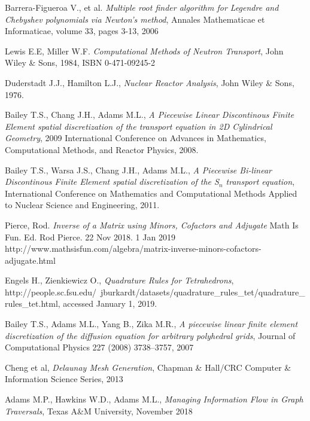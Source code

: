 \documentclass[11pt,letterpaper,titlepage]{article}
\numberwithin{equation}{section}
\begin{document}
\newpage
{}
\begin{thebibliography}{1}
    
     Barrera-Figueroa V., et al. {\em Multiple root finder algorithm for Legendre and Chebyshev polynomials via Newton’s method}, Annales Mathematicae et Informaticae, volume 33, pages 3-13, 2006
    
     Lewis E.E, Miller W.F. {\em Computational Methods of Neutron Transport}, John Wiley \& Sons, 1984, ISBN 0-471-09245-2
    
     Duderstadt J.J., Hamilton L.J., {\em Nuclear Reactor Analysis}, John Wiley \& Sons, 1976.
    
       Bailey T.S., Chang J.H., Adams M.L., {\em A Piecewise Linear Discontinous Finite Element spatial discretization of the transport equation in 2D Cylindrical Geometry}, 2009 International Conference on Advances in Mathematics, Computational Methods, and Reactor Physics, 2008.
    
      Bailey T.S., Warsa J.S., Chang J.H., Adams M.L., {\em A Piecewise Bi-linear Discontinous Finite Element spatial discretization of the S$_n$ transport equation}, International Conference on Mathematics and Computational Methods Applied to Nuclear Science and Engineering, 2011.
    
     Pierce, Rod. {\em Inverse of a Matrix using Minors, Cofactors and Adjugate} Math Is Fun. Ed. Rod Pierce. 22 Nov 2018. 1 Jan 2019 http://www.mathsisfun.com/algebra/matrix-inverse-minors-cofactors-adjugate.html
    
     Engels H., Zienkiewicz O., {\em Quadrature Rules for Tetrahedrons}, http://people.sc.fsu.edu/~jburkardt/datasets/quadrature\_rules\_tet/quadrature\_rules\_tet.html, accessed January 1, 2019.
    
     Bailey T.S., Adams M.L., Yang B., Zika M.R., {\em A piecewise linear finite element discretization of the diffusion equation for arbitrary polyhedral grids}, Journal of Computational Physics 227 (2008) 3738–3757, 2007
    
     Cheng et al, {\em Delaunay Mesh Generation}, Chapman \& Hall/CRC Computer \& Information Science Series, 2013
    
     Adams M.P., Hawkins W.D., Adams M.L., {\em Managing Information Flow in Graph Traversals}, Texas A\&M University, November 2018
    
    
\end{thebibliography}
\end{document}
